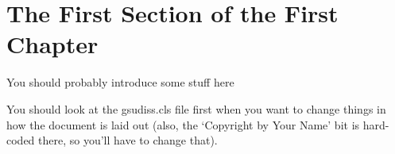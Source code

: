 \documentclass[../../main.tex]{subfiles}  %
\begin{document}
\section{The First Section of the First Chapter}
	You should probably introduce some stuff here
    
    You should look at the gsudiss.cls file first when you want to change things in how the document is laid out (also, the `Copyright by Your Name' bit is hard-coded there, so you'll have to change that).
\end{document}
